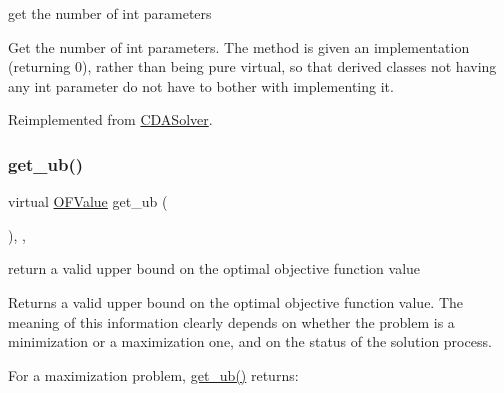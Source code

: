 get the number of int parameters 

Get the number of int parameters. The method is given an implementation (returning 0), rather than being pure virtual, so that derived classes not having any int parameter do not have to bother with implementing it. 

Reimplemented from \mbox{\hyperlink{class_s_m_spp__di__unipi__it_1_1_c_d_a_solver_a3ad74d9506761eb2ca4c8a936fb7a1c5}{C\+D\+A\+Solver}}.

\mbox{\label{class_s_m_spp__di__unipi__it_1_1_m_c_f_solver_a106686dbd21fcdd86e42130d39a7ec2f}} 
\subsubsection{\texorpdfstring{get\+\_\+ub()}{get\_ub()}}
{\footnotesize\ttfamily virtual \mbox{\hyperlink{class_s_m_spp__di__unipi__it_1_1_solver_ab8ce6bff9c21fdcd41e355167209301a}{O\+F\+Value}} get\+\_\+ub (\begin{DoxyParamCaption}\item[{void}]{ }\end{DoxyParamCaption})\hspace{0.3cm}{\ttfamily [inline]}, {\ttfamily [override]}, {\ttfamily [virtual]}}



return a valid upper bound on the optimal objective function value 

Returns a valid upper bound on the optimal objective function value. The meaning of this information clearly depends on whether the problem is a minimization or a maximization one, and on the status of the solution process.

For a maximization problem, \mbox{\hyperlink{class_s_m_spp__di__unipi__it_1_1_m_c_f_solver_a106686dbd21fcdd86e42130d39a7ec2f}{get\+\_\+ub()}} returns\+:



